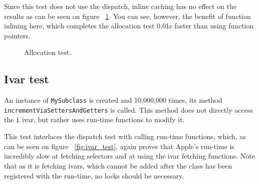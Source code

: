 Since this test does not use the dispatch, inline caching has no effect on the results as can be seen on figure ~\ref{fig:alloc_test}. You can see, however, the benefit of function inlining here, which completes the allocation test 0.01s faster than using function pointers.

\begin{figure}[H]
  \centering{}
  \caption{Allocation test.}
  \label{fig:alloc_test}
\end{figure}


\subsection{Ivar test}

An instance of \verb=MySubclass= is created and 10,000,000 times, its method \verb=incrementViaSettersAndGetters= is called. This method does not directly access the \verb=i= ivar, but rather uses run-time functions to modify it.

This test interlaces the dispatch test with calling run-time functions, which, as can be seen on figure ~\ref{fig:ivar_test}, again proves that Apple's run-time is incredibly slow at fetching selectors and at using the ivar fetching functions. Note that as it is fetching ivars, which cannot be added after the class has been registered with the run-time, no locks should be necessary.

